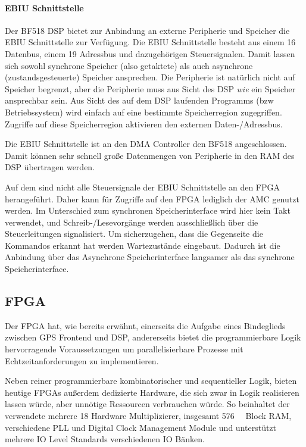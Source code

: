 
\paragraph{EBIU Schnittstelle}
Der BF518 DSP bietet zur Anbindung an externe Peripherie und Speicher die \gls{EBIU} Schnittstelle zur Verfügung. Die EBIU Schnittstelle besteht aus einem \SI{16}{\bit} Datenbus, einem \SI{19}{\bit} Adressbus und dazugehörigen Steuersignalen. Damit lassen sich sowohl synchrone Speicher (also getaktete) als auch asynchrone (zustandsgesteuerte) Speicher ansprechen. Die Peripherie ist natürlich nicht auf Speicher begrenzt, aber die Peripherie muss aus Sicht des DSP \emph{wie} ein Speicher ansprechbar sein. Aus Sicht des auf dem DSP laufenden Programms (bzw Betriebssystem) wird einfach auf eine bestimmte Speicherregion zugegriffen. Zugriffe auf diese Speicherregion aktivieren den externen Daten-/Adressbus.

Die EBIU Schnittstelle ist an den \gls{DMA} Controller den BF518 angeschlossen. Damit können sehr schnell große Datenmengen von Peripherie in den RAM des DSP übertragen werden.

Auf dem \comboard sind nicht alle Steuersignale der EBIU Schnittstelle an den FPGA herangeführt. Daher kann für Zugriffe auf den FPGA lediglich der \gls{AMC} genutzt werden. Im Unterschied zum synchronen Speicherinterface wird hier kein Takt verwendet, und Schreib-/Lesevorgänge werden ausschließlich über die Steuerleitungen signalisiert. Um sicherzugehen, dass die Gegenseite die Kommandos erkannt hat werden Wartezustände eingebaut. Dadurch ist die Anbindung über das Asynchrone Speicherinterface langsamer als das synchrone Speicherinterface.



\subsection{FPGA}
Der FPGA hat, wie bereits erwähnt, einerseits die Aufgabe eines Bindeglieds zwischen GPS Frontend und DSP, andererseits bietet die programmierbare Logik hervorragende Voraussetzungen um parallelisierbare Prozesse mit Echtzeitanforderungen zu implementieren. 

Neben reiner programmierbare kombinatorischer und sequentieller Logik, bieten heutige FPGAs außerdem dedizierte Hardware, die sich zwar in Logik realisieren lassen würde, aber unnötige Ressourcen verbrauchen würde. So beinhaltet der verwendete \comfpga mehrere \SI{18}{\bit} Hardware Multiplizierer, insgesamt \SI{576}{\kilo\bit} Block RAM, verschiedene PLL und Digital Clock Management Module und unterstützt mehrere IO Level Standards verschiedenen IO Bänken.